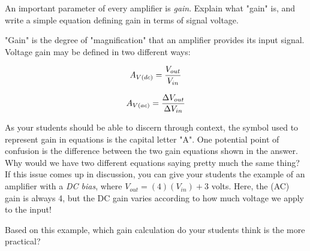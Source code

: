 

An important parameter of every amplifier is {\it gain}.  Explain what "gain" is, and write a simple equation defining gain in terms of signal voltage.







"Gain" is the degree of "magnification" that an amplifier provides its input signal.  Voltage gain may be defined in two different ways:

$$A_{V(dc)} = {V_{out} \over V_{in}}$$

$$A_{V(ac)} = {\Delta V_{out} \over \Delta V_{in}}$$







As your students should be able to discern through context, the symbol used to represent gain in equations is the capital letter "A".  One potential point of confusion is the difference between the two gain equations shown in the answer.  Why would we have two different equations saying pretty much the same thing?  If this issue comes up in discussion, you can give your students the example of an amplifier with a {\it DC bias}, where $V_{out} = (4)(V_{in}) + 3$ volts.  Here, the (AC) gain is always 4, but the DC gain varies according to how much voltage we apply to the input!

Based on this example, which gain calculation do your students think is the more practical?



